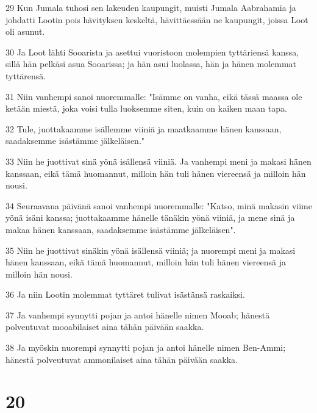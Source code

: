 \par 29 Kun Jumala tuhosi sen lakeuden kaupungit, muisti Jumala Aabrahamia ja johdatti Lootin pois hävityksen keskeltä, hävittäessään ne kaupungit, joissa Loot oli asunut.
\par 30 Ja Loot lähti Sooarista ja asettui vuoristoon molempien tyttäriensä kanssa, sillä hän pelkäsi asua Sooarissa; ja hän asui luolassa, hän ja hänen molemmat tyttärensä.
\par 31 Niin vanhempi sanoi nuoremmalle: "Isämme on vanha, eikä tässä maassa ole ketään miestä, joka voisi tulla luoksemme siten, kuin on kaiken maan tapa.
\par 32 Tule, juottakaamme isällemme viiniä ja maatkaamme hänen kanssaan, saadaksemme isästämme jälkeläisen."
\par 33 Niin he juottivat sinä yönä isällensä viiniä. Ja vanhempi meni ja makasi hänen kanssaan, eikä tämä huomannut, milloin hän tuli hänen viereensä ja milloin hän nousi.
\par 34 Seuraavana päivänä sanoi vanhempi nuoremmalle: "Katso, minä makasin viime yönä isäni kanssa; juottakaamme hänelle tänäkin yönä viiniä, ja mene sinä ja makaa hänen kanssaan, saadaksemme isästämme jälkeläisen".
\par 35 Niin he juottivat sinäkin yönä isällensä viiniä; ja nuorempi meni ja makasi hänen kanssaan, eikä tämä huomannut, milloin hän tuli hänen viereensä ja milloin hän nousi.
\par 36 Ja niin Lootin molemmat tyttäret tulivat isästänsä raskaiksi.
\par 37 Ja vanhempi synnytti pojan ja antoi hänelle nimen Mooab; hänestä polveutuvat mooabilaiset aina tähän päivään saakka.
\par 38 Ja myöskin nuorempi synnytti pojan ja antoi hänelle nimen Ben-Ammi; hänestä polveutuvat ammonilaiset aina tähän päivään saakka.

\chapter{20}

